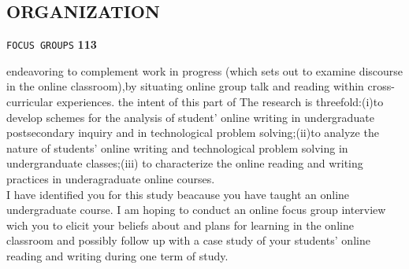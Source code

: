 \documentclass[a4,9pt]{beamer}
\begin{document}
\begin{frame}
\section*{ORGANIZATION}
\begin{flushright}
 \texttt{FOCUS GROUPS} \hspace*{1cm} \textbf{113}
\end{flushright}

\vspace*{0.5cm}
endeavoring to complement work in progress (which sets out to examine discourse in the online classroom),by situating online group talk and reading within cross-curricular experiences. the intent of this part of The research is threefold:(i)to develop schemes for the analysis of student' online writing in undergraduate postsecondary inquiry and in technological problem solving;(ii)to analyze the nature of students' online writing and technological problem solving in undergranduate classes;(iii) to characterize the online reading and writing practices in underagraduate online courses.\\

\vspace*{0.4cm}
I have identified you for this study beacause you have taught an online undergraduate course. I am hoping to conduct an online focus group interview wich you to elicit your beliefs about and plans for learning in the online classroom and possibly follow up with a case study of your students' online reading and writing during one term of study.\\ 

\vspace*{0.3cm}
\end{frame}
\end{document}
